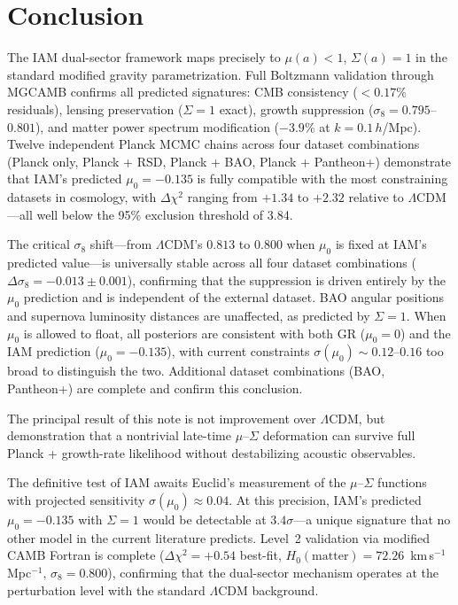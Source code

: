 \documentclass[11pt,letterpaper]{article}
\begin{document}
\section{Conclusion}

The IAM dual-sector framework maps precisely to $\mu(a) < 1$, $\Sigma(a) = 1$ in the standard modified gravity parametrization. Full Boltzmann validation through MGCAMB confirms all predicted signatures: CMB consistency ($< 0.17\%$ residuals), lensing preservation ($\Sigma = 1$ exact), growth suppression ($\sigma_8 = 0.795$--$0.801$), and matter power spectrum modification ($-3.9\%$ at $k = 0.1\,h$/Mpc). Twelve independent Planck MCMC chains across four dataset combinations (Planck only, Planck + RSD, Planck + BAO, Planck + Pantheon+) demonstrate that IAM's predicted $\mu_0 = -0.135$ is fully compatible with the most constraining datasets in cosmology, with $\Delta\chi^2$ ranging from $+1.34$ to $+2.32$ relative to $\Lambda$CDM---all well below the 95\% exclusion threshold of 3.84.

The critical $\sigma_8$ shift---from $\Lambda$CDM's $0.813$ to $0.800$ when $\mu_0$ is fixed at IAM's predicted value---is universally stable across all four dataset combinations ($\Delta\sigma_8 = -0.013 \pm 0.001$), confirming that the suppression is driven entirely by the $\mu_0$ prediction and is independent of the external dataset. BAO angular positions and supernova luminosity distances are unaffected, as predicted by $\Sigma = 1$. When $\mu_0$ is allowed to float, all posteriors are consistent with both GR ($\mu_0 = 0$) and the IAM prediction ($\mu_0 = -0.135$), with current constraints $\sigma(\mu_0) \sim 0.12$--$0.16$ too broad to distinguish the two. Additional dataset combinations (BAO, Pantheon+) are complete and confirm this conclusion.

The principal result of this note is not improvement over $\Lambda$CDM, but demonstration that a nontrivial late-time $\mu$--$\Sigma$ deformation can survive full Planck + growth-rate likelihood without destabilizing acoustic observables.

The definitive test of IAM awaits Euclid's measurement of the $\mu$--$\Sigma$ functions with projected sensitivity $\sigma(\mu_0) \approx 0.04$. At this precision, IAM's predicted $\mu_0 = -0.135$ with $\Sigma = 1$ would be detectable at $3.4\sigma$---a unique signature that no other model in the current literature predicts. Level~2 validation via modified CAMB Fortran is complete ($\Delta\chi^2 = +0.54$ best-fit, $H_0(\mathrm{matter}) = 72.26$~km\,s$^{-1}$\,Mpc$^{-1}$, $\sigma_8 = 0.800$), confirming that the dual-sector mechanism operates at the perturbation level with the standard $\Lambda$CDM background.
\end{document}
